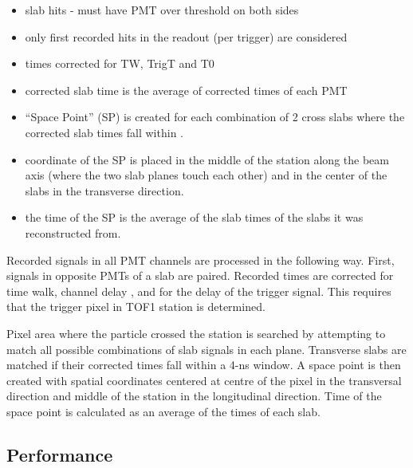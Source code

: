 \begin{itemize}
\item slab hits - must have PMT over threshold on both sides
\item only first recorded hits in the readout (per trigger) are considered
\item times corrected for TW, TrigT and T0
\item corrected slab time is the average of corrected times of each PMT
\item ``Space Point'' (SP) is created for each combination of 2 cross
  slabs where the corrected slab times fall within .
\item coordinate of the SP is placed in the middle of the station
  along the beam axis (where the two slab planes touch each other) and
  in the center of the slabs in the transverse direction.
\item the time of the SP is the average of the slab times of the slabs
  it was reconstructed from.
\end{itemize}

Recorded signals in all PMT channels are processed in the following
way. First, signals in opposite PMTs of a slab are paired. Recorded
times are corrected for time walk, channel delay \Tzero{}, and for the
delay of the trigger signal. This requires that the trigger pixel in
TOF1 station is determined.

Pixel area where the particle crossed the station is searched by
attempting to match all possible combinations of slab signals in each
plane. Transverse slabs are matched if their corrected times fall
within a 4-ns window. A space point is then created with spatial
coordinates centered at centre of the pixel in the transversal
direction and middle of the station in the longitudinal
direction. Time of the space point is calculated as an average of the
times of each slab.


\subsection{Performance}
\label{SubSect:TOF_Performance}


